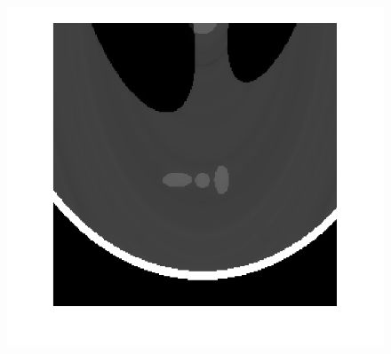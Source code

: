 \documentclass[hyperref]{ctexart}
\begin{document}
{\begin{figure}[htbp]
{				\includegraphics[scale=0.2]{3-2.png}
			}
			\quad
			\quad
		\end{figure}
	
}
\end{document}
